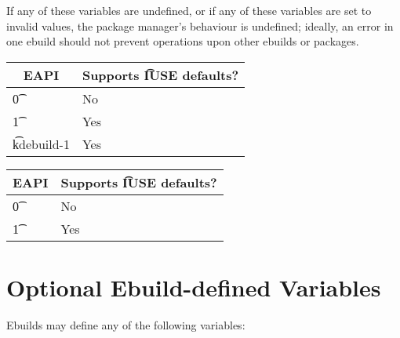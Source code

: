 If any of these variables are undefined, or if any of these variables are set to invalid values,
the package manager's behaviour is undefined; ideally, an error in one ebuild should not prevent
operations upon other ebuilds or packages.

\IFKDEBUILDELSE
{
    \begin{table}
    \begin{center}
     \label{iuse-defaults-table}
    \begin{tabular}{ l l }
        \hline
        \multicolumn{1}{c}{\textbf{EAPI}} &
        \multicolumn{1}{c}{\textbf{Supports \t{IUSE} defaults?}} \\
        \hline
    \t{0} & No \\
    \t{1} & Yes \\
    \t{kdebuild-1} & Yes \\
    \hline
    \end{tabular}
    \end{center}
    \end{table}
}
{
    \begin{table}
    \begin{center}
     \label{iuse-defaults-table}
    \begin{tabular}{ l l }
        \hline
        \multicolumn{1}{c}{\textbf{EAPI}} &
        \multicolumn{1}{c}{\textbf{Supports \t{IUSE} defaults?}} \\
        \hline
    \t{0} & No \\
    \t{1} & Yes \\
    \hline
    \end{tabular}
    \end{center}
    \end{table}
}

\section{Optional Ebuild-defined Variables}

Ebuilds may define any of the following variables:

